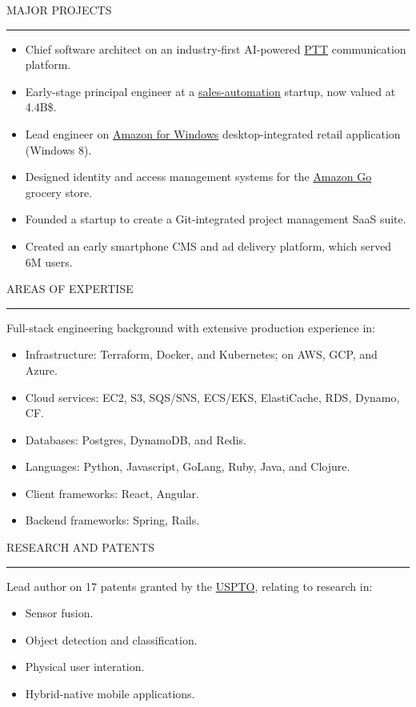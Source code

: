 \documentclass[12pt]{article}
\newcommand{\blockseparation}{\vspace{0.13in}}
\newcommand{\heading}[1]{
	\vspace{0.05in}
	\uppercase{#1}
	\vspace{0.05in}
	\hrule
	\blockseparation
}
\newcommand{\bulletheading}[1]{
	\vspace{0.075in}
	\hspace{0.1in}
	{#1}
	\vspace{0.03in}
}
\newenvironment{tightbullets}
{\begin{itemize}}
{\end{itemize}}
\newenvironment{bullets}
{\begin{tightbullets}}
{\end{tightbullets} \blockseparation}
\begin{document}
\begin{flushleft}
\heading{Major Projects}
\begin{bullets}
	\item Chief software architect on an industry-first AI-powered \href{https://www.orionlabs.io/video-overview-push-to-talk-2-0/}{PTT} communication platform.
	\item Early-stage principal engineer at a \href{https://www.outreach.io/resources/blog/sales-automation}{sales-automation} startup, now valued at 4.4B\$.
	\item Lead engineer on \href{https://blogs.microsoft.com/ai/amazon-app-for-windows-8/}{Amazon for Windows} desktop-integrated retail application (Windows 8).
	\item Designed identity and access management systems for the \href{https://www.amazon.com/b?ie=UTF8\&node=16008589011}{Amazon Go} grocery store.
	\item Founded a startup to create a Git-integrated project management SaaS suite.
	\item Created an early smartphone CMS and ad delivery platform, which served 6M users.
\end{bullets}


\heading{Areas of Expertise}
\bulletheading{Full-stack engineering background with extensive production experience in:}
\begin{bullets}
	\item Infrastructure: Terraform, Docker, and Kubernetes; on AWS, GCP, and Azure.
	\item Cloud services: EC2, S3, SQS/SNS, ECS/EKS, ElastiCache, RDS, Dynamo, CF.
	\item Databases: Postgres, DynamoDB, and Redis.
	\item Languages: Python, Javascript, GoLang, Ruby, Java, and Clojure.
	\item Client frameworks: React, Angular.
	\item Backend frameworks: Spring, Rails.
\end{bullets}


\heading{Research and Patents}
\bulletheading{Lead author on 17 patents granted by the \href{https://patents.google.com/?inventor=McNamara+Alexander+Michael}{USPTO}, relating to research in:}
\begin{bullets}
	\item Sensor fusion.
	\item Object detection and classification.
	\item Physical user interation.
	\item Hybrid-native mobile applications.
\end{bullets}


\end{flushleft}
\end{document}
